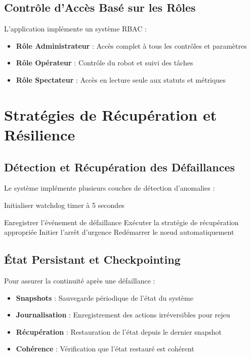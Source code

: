\documentclass[12pt,a4paper,oneside]{report}
\begin{document}
\subsection{Contrôle d'Accès Basé sur les Rôles}

L'application implémente un système RBAC :

\begin{itemize}
  \item \textbf{Rôle Administrateur} : Accès complet à tous les contrôles et paramètres
  \item \textbf{Rôle Opérateur} : Contrôle du robot et suivi des tâches
  \item \textbf{Rôle Spectateur} : Accès en lecture seule aux statuts et métriques
\end{itemize}

\section{Stratégies de Récupération et Résilience}

\subsection{Détection et Récupération des Défaillances}

Le système implémente plusieurs couches de détection d'anomalies :

\begin{algorithm}[H]
\caption{Détection et Récupération des Défaillances}
\begin{algorithmic}
  \State Initialiser watchdog timer à 5 secondes
  
      \State Enregistrer l'événement de défaillance
      \State Exécuter la stratégie de récupération appropriée
        \State Initier l'arrêt d'urgence
      \Else
        \State Redémarrer le nœud automatiquement
      \EndIf
    \EndIf
  \EndFor
\end{algorithmic}
\end{algorithm}

\subsection{État Persistant et Checkpointing}

Pour assurer la continuité après une défaillance :

\begin{itemize}
  \item \textbf{Snapshots} : Sauvegarde périodique de l'état du système
  \item \textbf{Journalisation} : Enregistrement des actions irréversibles pour rejeu
  \item \textbf{Récupération} : Restauration de l'état depuis le dernier snapshot
  \item \textbf{Cohérence} : Vérification que l'état restauré est cohérent
\end{itemize}
\end{document}
